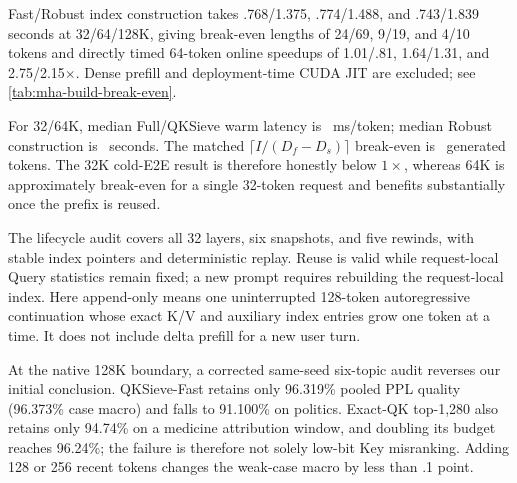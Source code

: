 Fast/Robust index construction takes .768/1.375, .774/1.488, and
.743/1.839 seconds at 32/64/128K, giving break-even lengths of 24/69, 9/19,
and 4/10 tokens and directly timed 64-token online speedups of 1.01/.81,
1.64/1.31, and 2.75/2.15$\times$.  Dense prefill and deployment-time CUDA JIT
are excluded; see \cref{tab:mha-build-break-even}.

\begin{table}[t]
\caption{Directly timed persistent-cache lifecycle on the same MHA model and
RTX~3090 host.  Cold-index includes the Robust build and one 32-token branch
but excludes dense prefill; cold-E2E includes prefill.  Warm reuses the index;
four-branch amortization shares one build over 128 generated tokens.  Entries
are medians and 95\% process-repetition intervals from three independent
processes on one fixed deterministic workload.}
\label{tab:persistent-kv-main}
\centering
{}
\end{table}

For 32/64K, median Full/QKSieve warm latency is
\QKSievePersistentWarmLatencyText\ ms/token; median Robust construction is
\QKSievePersistentBuildText\ seconds.  The matched
$\lceil I/(D_f-D_s)\rceil$ break-even is
\QKSievePersistentBreakEvenText\ generated tokens.  The 32K cold-E2E result
is therefore honestly below $1\times$, whereas 64K is approximately break-even
for a single 32-token request and benefits substantially once the prefix is
reused.

The lifecycle audit covers all 32 layers, six snapshots, and five rewinds,
with stable index pointers and deterministic replay.  Reuse is valid while
request-local Query statistics remain fixed; a new prompt requires rebuilding
the request-local index.  Here append-only means one uninterrupted 128-token
autoregressive continuation whose exact K/V and auxiliary index entries grow
one token at a time.  It does not include delta prefill for a new user turn.


At the native 128K boundary, a corrected same-seed six-topic audit reverses
our initial conclusion.  QKSieve-Fast retains only 96.319\% pooled PPL
quality (96.373\% case macro) and falls to 91.100\% on politics.  Exact-QK
top-1,280 also retains only 94.74\% on a medicine attribution window, and
doubling its budget reaches 96.24\%; the failure is therefore not solely
low-bit Key misranking.  Adding 128 or 256 recent tokens changes the weak-case
macro by less than .1 point.

